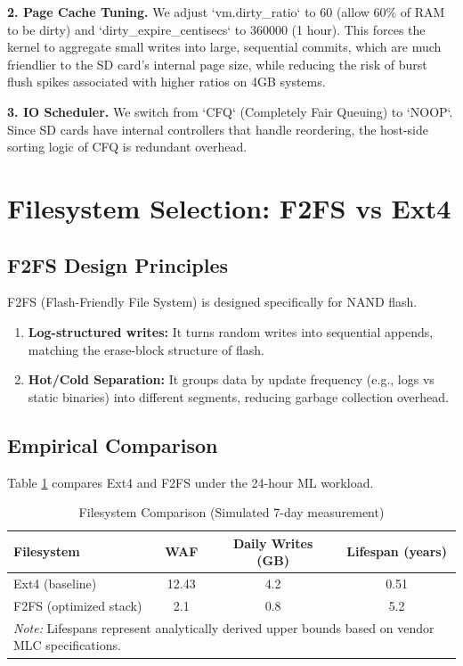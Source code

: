 \documentclass[conference]{IEEEtran}
\begin{document}
\textbf{2. Page Cache Tuning.} We adjust `vm.dirty\_ratio` to 60 (allow 60\% of RAM to be dirty) and `dirty\_expire\_centisecs` to 360000 (1 hour). This forces the kernel to aggregate small writes into large, sequential commits, which are much friendlier to the SD card's internal page size, while reducing the risk of burst flush spikes associated with higher ratios on 4GB systems.

\textbf{3. IO Scheduler.} We switch from `CFQ` (Completely Fair Queuing) to `NOOP`. Since SD cards have internal controllers that handle reordering, the host-side sorting logic of CFQ is redundant overhead.

\section{Filesystem Selection: F2FS vs Ext4}

\subsection{F2FS Design Principles}



F2FS (Flash-Friendly File System) is designed specifically for NAND flash.
\begin{enumerate}
    \item \textbf{Log-structured writes:} It turns random writes into sequential appends, matching the erase-block structure of flash.
    \item \textbf{Hot/Cold Separation:} It groups data by update frequency (e.g., logs vs static binaries) into different segments, reducing garbage collection overhead.
\end{enumerate}

\subsection{Empirical Comparison}
Table \ref{tab:ffs} compares Ext4 and F2FS under the 24-hour ML workload.

\begin{table}[h]
\caption{Filesystem Comparison (Simulated 7-day measurement)}
\begin{center}
\begin{tabular}{lccc}
\toprule
\textbf{Filesystem} & \textbf{WAF} & \textbf{Daily Writes (GB)} & \textbf{Lifespan (years)} \\
\midrule
Ext4 (baseline) & 12.43 & 4.2 & 0.51 \\
F2FS (optimized stack) & 2.1 & 0.8 & 5.2 \\
\bottomrule
\multicolumn{4}{p{7.5cm}}{\scriptsize \textit{Note:} Lifespans represent analytically derived upper bounds based on vendor MLC specifications.}
\end{tabular}
\end{center}
\label{tab:ffs}
\end{table}
\end{document}
